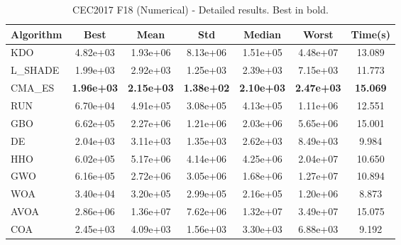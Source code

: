 \begin{table}[H]
\centering\small
\caption{CEC2017 F18 (Numerical) - Detailed results. Best in bold.}
\label{tab:cec2017_F18}
\begin{tabular}{lcccccc}
\toprule
\textbf{Algorithm} & \textbf{Best} & \textbf{Mean} & \textbf{Std} & \textbf{Median} & \textbf{Worst} & \textbf{Time(s)} \\
\midrule
KDO & 4.82e+03 & 1.93e+06 & 8.13e+06 & 1.51e+05 & 4.48e+07 & 13.089 \\
L_SHADE & 1.99e+03 & 2.92e+03 & 1.25e+03 & 2.39e+03 & 7.15e+03 & 11.773 \\
CMA_ES & \textbf{1.96e+03} & \textbf{2.15e+03} & \textbf{1.38e+02} & \textbf{2.10e+03} & \textbf{2.47e+03} & \textbf{15.069} \\
RUN & 6.70e+04 & 4.91e+05 & 3.08e+05 & 4.13e+05 & 1.11e+06 & 12.551 \\
GBO & 6.62e+05 & 2.27e+06 & 1.21e+06 & 2.03e+06 & 5.65e+06 & 15.001 \\
DE & 2.04e+03 & 3.11e+03 & 1.35e+03 & 2.62e+03 & 8.49e+03 & 9.984 \\
HHO & 6.02e+05 & 5.17e+06 & 4.14e+06 & 4.25e+06 & 2.04e+07 & 10.650 \\
GWO & 6.16e+05 & 2.72e+06 & 3.05e+06 & 1.68e+06 & 1.27e+07 & 10.894 \\
WOA & 3.40e+04 & 3.20e+05 & 2.99e+05 & 2.16e+05 & 1.20e+06 & 8.873 \\
AVOA & 2.86e+06 & 1.36e+07 & 7.62e+06 & 1.32e+07 & 3.49e+07 & 15.075 \\
COA & 2.45e+03 & 4.09e+03 & 1.56e+03 & 3.30e+03 & 6.88e+03 & 9.192 \\
\bottomrule
\end{tabular}
\end{table}
